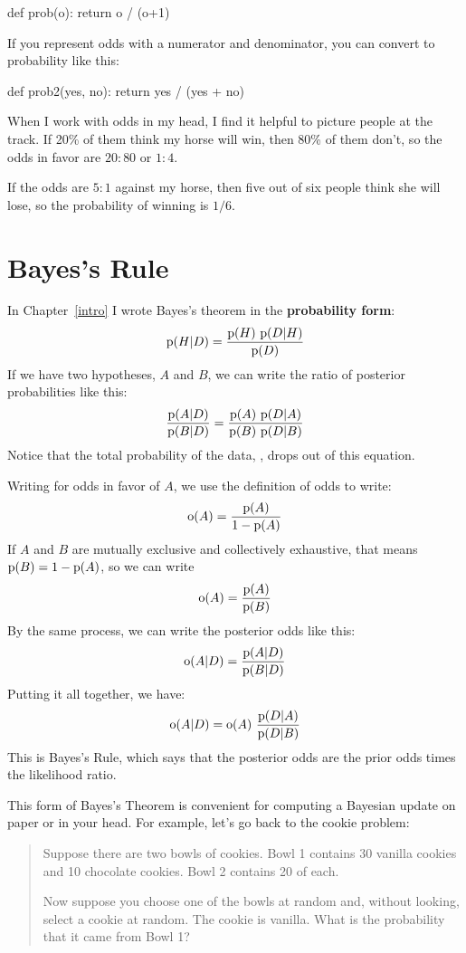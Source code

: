 \documentclass[12pt]{book}
\theoremstyle{exercise}
\begin{document}
\begin{code}
def prob(o):
    return o / (o+1)
\end{code}

If you represent odds with a numerator and denominator, you
can convert to probability like this:

\begin{code}
def prob2(yes, no):
    return yes / (yes + no)
\end{code}

When I work with odds in my head, I find it helpful to picture
people at the track.  If 20\% of them think my horse will win,
then 80\% of them don't, so the odds in favor are $20:80$ or
$1:4$.

If the odds are $5:1$ against my horse, then five out of six
people think she will lose, so the probability of winning
is $1/6$.



\section{Bayes's Rule}


In Chapter~\ref{intro} I wrote Bayes's theorem in the {\bf probability
form}:
%
\[ \mathrm{p}(H|D) = \frac{\mathrm{p}(H)~\mathrm{p}(D|H)}{\mathrm{p}(D)} \]
%
If we have two hypotheses, $A$ and $B$,
we can write the ratio of posterior probabilities like this:
%
\[ \frac{\mathrm{p}(A|D)}{\mathrm{p}(B|D)} = \frac{\mathrm{p}(A)~\mathrm{p}(D|A)}
                                        {\mathrm{p}(B)~\mathrm{p}(D|B)} \]
%
Notice that the total probability of the data, , drops out of
this equation.

Writing  for odds in favor of $A$, we use the definition of odds to write:
%
\[ \mathrm{o}(A) = \frac{\mathrm{p}(A)}{1-\mathrm{p}(A)} \]
%
If $A$ and $B$ are mutually exclusive and collectively exhaustive,
that means $\mathrm{p}(B) = 1 - \mathrm{p}(A)$, so we can write
%
\[ \mathrm{o}(A) = \frac{\mathrm{p}(A)}{\mathrm{p}(B)}  \]
%
By the same process, we can write the posterior odds like this:
%
\[ \mathrm{o}(A|D) = \frac{\mathrm{p}(A|D)}{\mathrm{p}(B|D)}  \]
%
Putting it all together, we have:
%
\[ \mathrm{o}(A|D) = \mathrm{o}(A)~\frac{\mathrm{p}(D|A)}{\mathrm{p}(D|B)} \]
%
This is Bayes's Rule, which says that the posterior odds are the prior odds times the likelihood ratio.

This form of Bayes's Theorem is convenient for computing a Bayesian update on paper or in your head.
For example, let's go back to the cookie problem:

\begin{quote}
Suppose there are two bowls of cookies.
Bowl 1 contains 30 vanilla cookies and 10 chocolate cookies.
Bowl 2 contains 20 of each.

Now suppose you choose one of the bowls at random and, without
looking, select a cookie at random.
The cookie is vanilla.
What is the probability that it came from Bowl 1?
\end{quote}
\end{document}
